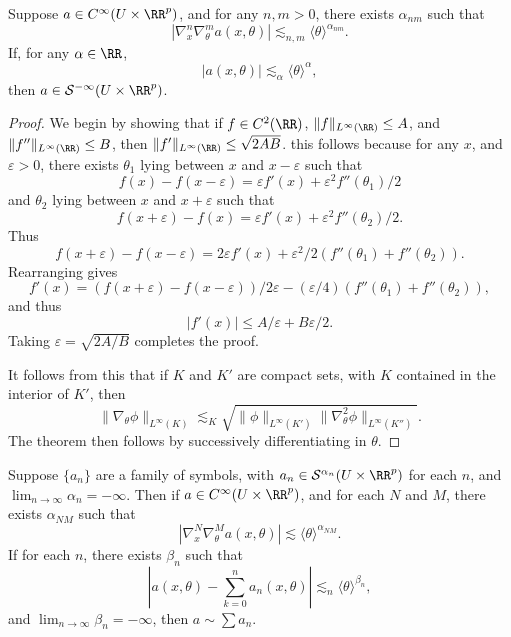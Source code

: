 \begin{lemma}
    Suppose $a \in C^\infty(U \times \RR^p)$, and for any $n,m > 0$, there exists $\alpha_{nm}$ such that
    \[ |\nabla^n_x \nabla^m_\theta a(x,\theta)| \lesssim_{n,m} \langle \theta \rangle^{\alpha_{nm}}. \]
    If, for any $\alpha \in \RR$,
    \[ |a(x,\theta)| \lesssim_\alpha \langle \theta \rangle^\alpha, \]
    then $a \in \mathcal{S}^{-\infty}(U \times \RR^p)$.
\end{lemma}
\begin{proof}
    We begin by showing that if $f \in C^2(\RR)$, $\| f \|_{L^\infty(\RR)} \leq A$, and $\| f'' \|_{L^\infty(\RR)} \leq B$, then $\| f' \|_{L^\infty(\RR)} \leq \sqrt{2AB}$. this follows because for any $x$, and $\varepsilon > 0$, there exists $\theta_1$ lying between $x$ and $x - \varepsilon$ such that
    \[ f(x) - f(x-\varepsilon) = \varepsilon f'(x) + \varepsilon^2 f''(\theta_1) / 2 \]
    and $\theta_2$ lying between $x$ and $x + \varepsilon$ such that
    \[ f(x + \varepsilon) - f(x) = \varepsilon f'(x) + \varepsilon^2 f''(\theta_2)/2. \]
    Thus
    \[ f(x+\varepsilon) - f(x-\varepsilon) = 2 \varepsilon f'(x) + \varepsilon^2 / 2 (f''(\theta_1) + f''(\theta_2)). \]
    Rearranging gives
    \[ f'(x) = (f(x+\varepsilon) - f(x-\varepsilon))/2 \varepsilon - (\varepsilon / 4)(f''(\theta_1) + f''(\theta_2)), \]
    and thus
    \[ |f'(x)| \leq A/\varepsilon + B \varepsilon / 2. \]
    Taking $\varepsilon = \sqrt{2A/B}$ completes the proof.

    It follows from this that if $K$ and $K'$ are compact sets, with $K$ contained in the interior of $K'$, then
    \[ \| \nabla_\theta \phi \|_{L^\infty(K)} \lesssim_K \sqrt{\| \phi \|_{L^\infty(K')} \| \nabla_\theta^2 \phi \|_{L^\infty(K'')} }. \]
    The theorem then follows by successively differentiating in $\theta$.
\end{proof}

\begin{corollary}
    Suppose $\{ a_n \}$ are a family of symbols, with $a_n \in \mathcal{S}^{\alpha_n}(U \times \RR^p)$ for each $n$, and $\lim_{n \to \infty} \alpha_n = -\infty$. Then if $a \in C^\infty(U \times \RR^p)$, and for each $N$ and $M$, there exists $\alpha_{NM}$ such that
    \[ |\nabla^N_x \nabla^M_\theta a(x,\theta)| \lesssim \langle \theta \rangle^{\alpha_{NM}}. \]
    If for each $n$, there exists $\beta_n$ such that
    \[ |a(x,\theta) - \sum_{k = 0}^n a_n(x,\theta)| \lesssim_n \langle \theta \rangle^{\beta_n}, \]
    and $\lim_{n \to \infty} \beta_n = -\infty$, then $a \sim \sum a_n$.
\end{corollary}

